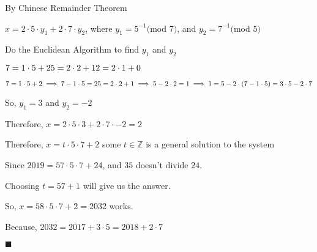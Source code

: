 \documentclass{article}
\begin{document}
By Chinese Remainder Theorem

$x = 2\cdot 5 \cdot y_1 + 2\cdot 7\cdot y_2$, where $y_1 = 5^{-1}
($mod $7)$, and $y_2 = 7^{-1} ($mod $5)$

Do the Euclidean Algorithm to find $y_1$ and $y_2$

$7 = 1\cdot5 + 2\\
5 = 2\cdot2 + 1\\
2 = 2\cdot1 + 0\\$

$7 = 1\cdot5 + 2\implies 7 - 1\cdot5 = 2\\
5 = 2\cdot2 + 1 \implies 5 - 2\cdot2 = 1\\
\implies 1 = 5 - 2\cdot(7 - 1\cdot5) = 3\cdot5 -2\cdot 7 $

So, $y_1 = 3$ and $y_2 = -2$

Therefore, $x = 2\cdot 5 \cdot 3 + 2\cdot 7\cdot -2 = 2$

Therefore, $x = t\cdot 5 \cdot 7 + 2$ some $t \in \mathbb{Z}$ is a
general solution to the system

Since $2019 = 57\cdot 5\cdot 7 + 24$, and $35$ doesn't divide $24$.

Choosing $t = 57+1$ will give us the answer.

So, $x = 58\cdot 5 \cdot 7 + 2 = 2032$ works.

Because, $2032 = 2017 + 3\cdot 5 = 2018 + 2\cdot7$

\vspace{0.618 em}
$\blacksquare$
\end{document}
